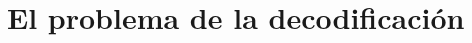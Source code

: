 \documentclass{beamer}
\theoremstyle{plain}
\theoremstyle{example}
\theoremstyle{example}
\begin{document}




\section{El problema de la decodificación}
\end{document}

